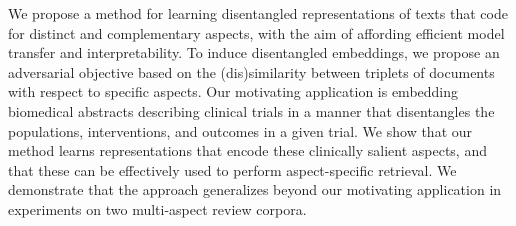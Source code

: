 We propose a method for learning disentangled representations of texts that code for distinct and complementary aspects, with the aim of affording efficient model transfer and interpretability. To induce disentangled embeddings, we propose an adversarial objective based on the (dis)similarity between triplets of documents with respect to specific aspects. Our motivating application is embedding biomedical abstracts describing clinical trials in a manner that disentangles the populations, interventions, and outcomes in a given trial. We show that our method learns representations that encode these clinically salient aspects, and that these can be effectively used to perform aspect-specific retrieval. We demonstrate that the approach generalizes beyond our motivating application in experiments on two multi-aspect review corpora.
